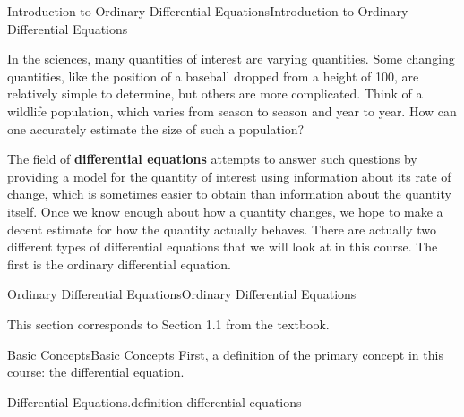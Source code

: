 \documentclass[10pt,]{book}
\newcommand{\terminology}[1]{\textbf{#1}}
\numberwithin{equation}{section}
\begin{document}
%
%
\typeout{************************************************}
\typeout{************************************************}
%
\begin{chapterptx}{Introduction to Ordinary Differential Equations}{}{Introduction to Ordinary Differential Equations}{}{}\label{intro-to-odes}
\begin{introduction}{}%
\hypertarget{p-1}{}%
In the sciences, many quantities of interest are varying quantities. Some changing quantities, like the position of a baseball dropped from a height of \SI{100}{\foot}, are relatively simple to determine, but others are more complicated. Think of a wildlife population, which varies from season to season and year to year. How can one accurately estimate the size of such a population?%
\par
\hypertarget{p-2}{}%
The field of \terminology{differential equations} attempts to answer such questions by providing a model for the quantity of interest using information about its rate of change, which is sometimes easier to obtain than information about the quantity itself. Once we know enough about how a quantity changes, we hope to make a decent estimate for how the quantity actually behaves. There are actually two different types of differential equations that we will look at in this course. The first is the ordinary differential equation.%
\end{introduction}%
%
%
\typeout{************************************************}
\typeout{************************************************}
%
\begin{sectionptx}{Ordinary Differential Equations}{}{Ordinary Differential Equations}{}{}\label{section-ordinary-differential-equations}
\begin{introduction}{}%
\hypertarget{p-3}{}%
This section corresponds to Section 1.1 from the textbook.%
\end{introduction}%
%
%
\typeout{************************************************}
\typeout{************************************************}
%
\begin{subsectionptx}{Basic Concepts}{}{Basic Concepts}{}{}\label{subsection-basic-concepts-for-odes}
\hypertarget{p-4}{}%
First, a definition of the primary concept in this course: the differential equation.%
\begin{definition}{Differential Equations.}{definition-differential-equations}%

\end{definition}
\end{subsectionptx}
\end{sectionptx}
\end{chapterptx}
\end{document}
